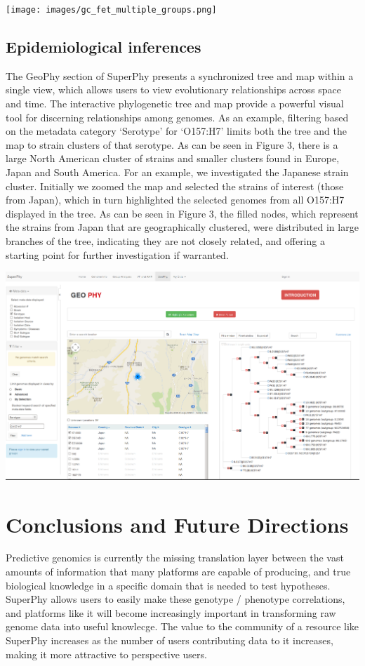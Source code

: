 \documentclass{bmcart}
\begin{document}
\texttt{[image: images/gc\_fet\_multiple\_groups.png]}

\subsection{Epidemiological inferences}
The GeoPhy section of SuperPhy presents a synchronized tree and map within a single view, which allows users to view evolutionary relationships across space and time. The interactive phylogenetic tree and map provide a powerful visual tool for discerning relationships among genomes. As an example, filtering based on the metadata category `Serotype' for `O157:H7' limits both the tree and the map to strain clusters of that serotype. As can be seen in Figure 3, there is a large North American cluster of strains and smaller clusters found in Europe, Japan and South America. For an example, we investigated the Japanese strain cluster. Initially we zoomed the map and selected the strains of interest (those from Japan), which in turn highlighted the selected genomes from all O157:H7 displayed in the tree. As can be seen in Figure 3, the filled nodes, which represent the strains from Japan that are geographically clustered, were distributed in large branches of the tree, indicating they are not closely related, and offering a starting point for further investigation if warranted.

\includegraphics[width=\textwidth]{images/geophy_o157.png}

\section{Conclusions and Future Directions}
Predictive genomics is currently the missing translation layer between the vast amounts of information that many platforms are capable of producing, and true biological knowledge in a specific domain that is needed to test hypotheses. SuperPhy allows users to easily make these genotype / phenotype correlations, and platforms like it will become increasingly important in transforming raw genome data into useful knowlecge. The value to the community of a resource like SuperPhy increases as the number of users contributing data to it increases, making it more attractive to perspective users. 
 
\end{document}
